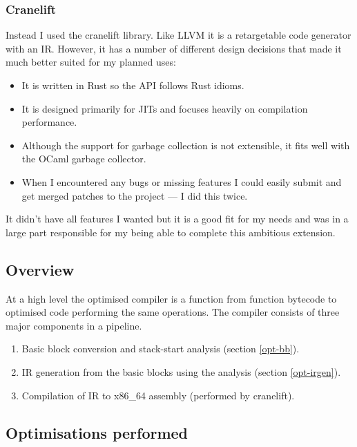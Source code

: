 \subsubsection{Cranelift}

Instead I used the cranelift library. Like LLVM it is a retargetable code generator with an IR.
However, it has a number of different design decisions that made it much better suited for my
planned uses:

\begin{itemize}
      \item It is written in Rust so the API follows Rust idioms.
      \item It is designed primarily for JITs and focuses heavily on compilation performance.
      \item Although the support for garbage collection is not extensible, it fits well with the
            OCaml garbage collector.
      \item When I encountered any bugs or missing features I could easily submit and get merged
            patches to the project --- I did this twice.
\end{itemize}

It didn't have all features I wanted but it is a good fit for my needs and was in a large part
responsible for my being able to complete this ambitious extension.

\subsection{Overview}

At a high level the optimised compiler is a function from function bytecode to optimised code
performing the same operations.  The compiler consists of three major components in a pipeline.

\begin{enumerate}
      \item Basic block conversion and stack-start analysis (section \ref{opt-bb}).
      \item IR generation from the basic blocks using the analysis (section \ref{opt-irgen}).
      \item Compilation of IR to x86\_64 assembly (performed by cranelift).
\end{enumerate}

\subsection{Optimisations performed}

